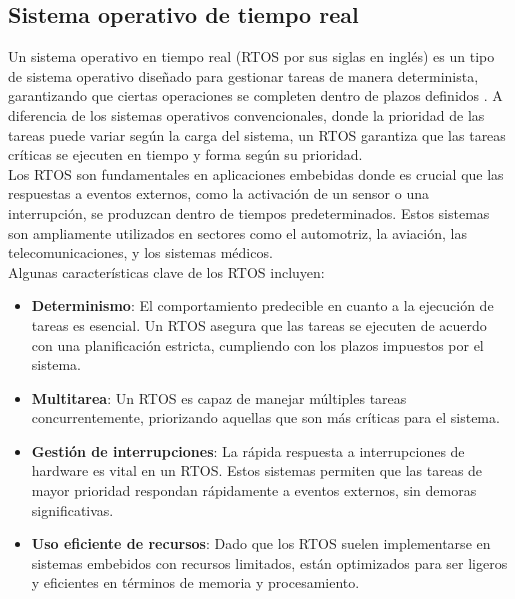 \subsection{Sistema operativo de tiempo real}

Un sistema operativo en tiempo real (RTOS por sus siglas en inglés) es un tipo de sistema operativo diseñado para gestionar tareas de manera determinista, garantizando que ciertas operaciones se completen dentro de plazos definidos \cite{rtos}. A diferencia de los sistemas operativos convencionales, donde la prioridad de las tareas puede variar según la carga del sistema, un RTOS garantiza que las tareas críticas se ejecuten en tiempo y forma según su prioridad. \\

Los RTOS son fundamentales en aplicaciones embebidas donde es crucial que las respuestas a eventos externos, como la activación de un sensor o una interrupción, se produzcan dentro de tiempos predeterminados. Estos sistemas son ampliamente utilizados en sectores como el automotriz, la aviación, las telecomunicaciones, y los sistemas médicos. \\

Algunas características clave de los RTOS incluyen:

\begin{itemize}
    \item \textbf{Determinismo}: El comportamiento predecible en cuanto a la ejecución de tareas es esencial. Un RTOS asegura que las tareas se ejecuten de acuerdo con una planificación estricta, cumpliendo con los plazos impuestos por el sistema.

    \item \textbf{Multitarea}: Un RTOS es capaz de manejar múltiples tareas concurrentemente, priorizando aquellas que son más críticas para el sistema.

    \item \textbf{Gestión de interrupciones}: La rápida respuesta a interrupciones de hardware es vital en un RTOS. Estos sistemas permiten que las tareas de mayor prioridad respondan rápidamente a eventos externos, sin demoras significativas.

    \item \textbf{Uso eficiente de recursos}: Dado que los RTOS suelen implementarse en sistemas embebidos con recursos limitados, están optimizados para ser ligeros y eficientes en términos de memoria y procesamiento.

\end{itemize}


